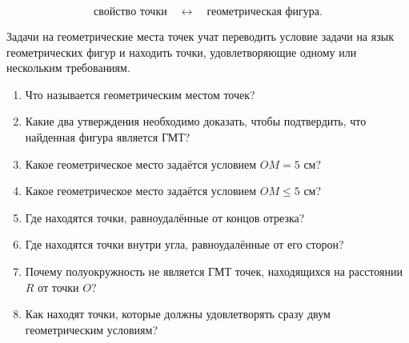 	\begin{propertybox}
		\[
		\text{свойство точки}
		\quad\longleftrightarrow\quad
		\text{геометрическая фигура}.
		\]
	\end{propertybox}
	
	Задачи на геометрические места точек учат переводить условие задачи
	на язык геометрических фигур и находить точки, удовлетворяющие одному
	или нескольким требованиям.
	
	\begin{questionsbox}
		\begin{enumerate}
			\item Что называется геометрическим местом точек?
			\item Какие два утверждения необходимо доказать, чтобы подтвердить,
			что найденная фигура является ГМТ?
			\item Какое геометрическое место задаётся условием \(OM=5\text{ см}\)?
			\item Какое геометрическое место задаётся условием \(OM\leq 5\text{ см}\)?
			\item Где находятся точки, равноудалённые от концов отрезка?
			\item Где находятся точки внутри угла, равноудалённые от его сторон?
			\item Почему полуокружность не является ГМТ точек,
			находящихся на расстоянии \(R\) от точки \(O\)?
			\item Как находят точки, которые должны удовлетворять сразу двум
			геометрическим условиям?
		\end{enumerate}
	\end{questionsbox}
